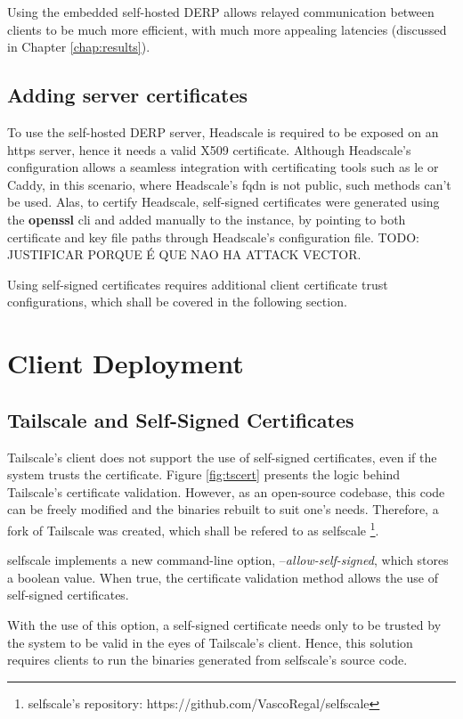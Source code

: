 \documentclass[11pt,twoside,a4paper]{report}
\begin{document}
Using the embedded self-hosted \ac{DERP} allows relayed communication between clients to be much more efficient, with much more appealing latencies (discussed in Chapter \ref{chap:results}).


\subsection{Adding server certificates}

To use the self-hosted \ac{DERP} server, Headscale is required to be exposed on an \ac{https} server, hence it needs a valid X509 certificate. Although Headscale's configuration allows a seamless integration with certificating tools such as \ac{le} or Caddy, in this scenario, where Headscale's \ac{fqdn} is not public, such methods can't be used. Alas, to certify Headscale, self-signed certificates were generated using the \textbf{openssl} \ac{cli} and added manually to the instance, by pointing to both certificate and key file paths through Headscale's configuration file. TODO: JUSTIFICAR PORQUE É QUE NAO HA ATTACK VECTOR.

Using self-signed certificates requires additional client certificate trust configurations, which shall be covered in the following section.

\section{Client Deployment}

\subsection{Tailscale and Self-Signed Certificates}
\label{sec:selfscale}

Tailscale's client does not support the use of self-signed certificates, even if the system trusts the certificate. Figure \ref{fig:tscert} presents the logic behind Tailscale's certificate validation. However, as an open-source codebase, this code can be freely modified and the binaries rebuilt to suit one's needs. Therefore, a fork of Tailscale was created, which shall be refered to as selfscale \footnote{selfscale's repository: https://github.com/VascoRegal/selfscale}.

selfscale implements a new command-line option, --\emph{allow-self-signed}, which stores a boolean value. When true, the certificate validation method allows the use of self-signed certificates.

With the use of this option, a self-signed certificate needs only to be trusted by the system to be valid in the eyes of Tailscale's client. Hence, this solution requires clients to run the binaries generated from selfscale's source code.
\end{document}
